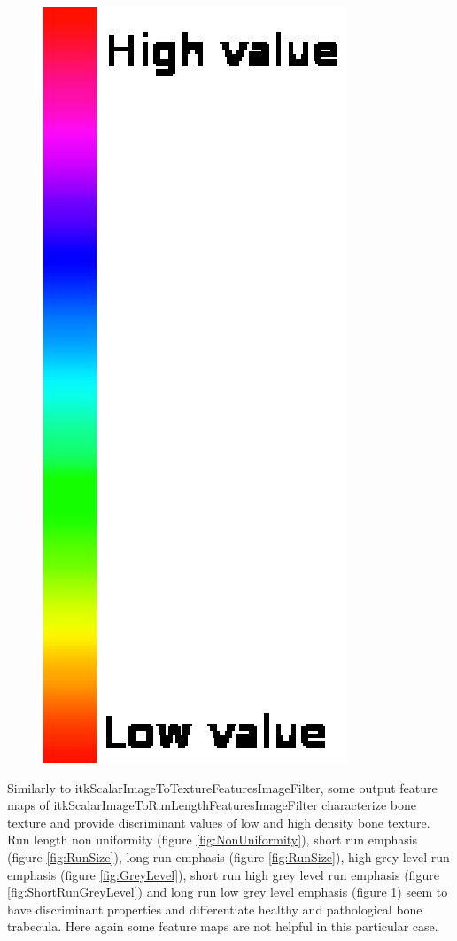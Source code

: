 \documentclass{InsightArticle}
\begin{document}
\begin{figure}[H]
\begin{center}
    \includegraphics[scale=0.32]{figures/discreteFullRainbow.eps}
    \label{fig:LongRunGreyLevel}
  \end{center}
\end{figure}

Similarly to itkScalarImageToTextureFeaturesImageFilter, some output feature maps of itkScalarImageToRunLengthFeaturesImageFilter characterize bone texture and provide discriminant values of low and high density bone texture. Run length non uniformity (figure \ref{fig:NonUniformity}), short run emphasis (figure \ref{fig:RunSize}), long run emphasis (figure \ref{fig:RunSize}), high grey level run emphasis (figure \ref{fig:GreyLevel}), short run high grey level run emphasis (figure \ref{fig:ShortRunGreyLevel}) and long run low grey level emphasis (figure \ref{fig:LongRunGreyLevel}) seem to have discriminant properties and differentiate healthy and pathological bone trabecula. Here again some feature maps are not helpful in this particular case.
\end{document}
